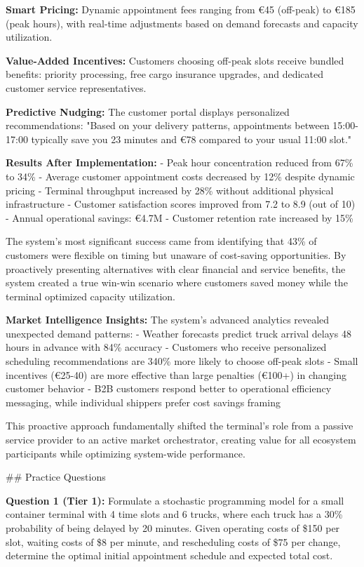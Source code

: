\documentclass{article}
\begin{document}
\textbf{Smart Pricing:} Dynamic appointment fees ranging from €45 (off-peak) to €185 (peak hours), with real-time adjustments based on demand forecasts and capacity utilization.

\textbf{Value-Added Incentives:} Customers choosing off-peak slots receive bundled benefits: priority processing, free cargo insurance upgrades, and dedicated customer service representatives.

\textbf{Predictive Nudging:} The customer portal displays personalized recommendations: "Based on your delivery patterns, appointments between 15:00-17:00 typically save you 23 minutes and €78 compared to your usual 11:00 slot."

\textbf{Results After Implementation:}
- Peak hour concentration reduced from 67\% to 34\%
- Average customer appointment costs decreased by 12\% despite dynamic pricing
- Terminal throughput increased by 28\% without additional physical infrastructure
- Customer satisfaction scores improved from 7.2 to 8.9 (out of 10)
- Annual operational savings: €4.7M
- Customer retention rate increased by 15\%

The system's most significant success came from identifying that 43\% of customers were flexible on timing but unaware of cost-saving opportunities. By proactively presenting alternatives with clear financial and service benefits, the system created a true win-win scenario where customers saved money while the terminal optimized capacity utilization.

\textbf{Market Intelligence Insights:} The system's advanced analytics revealed unexpected demand patterns:
- Weather forecasts predict truck arrival delays 48 hours in advance with 84\% accuracy
- Customers who receive personalized scheduling recommendations are 340\% more likely to choose off-peak slots
- Small incentives (€25-40) are more effective than large penalties (€100+) in changing customer behavior
- B2B customers respond better to operational efficiency messaging, while individual shippers prefer cost savings framing

This proactive approach fundamentally shifted the terminal's role from a passive service provider to an active market orchestrator, creating value for all ecosystem participants while optimizing system-wide performance.

## Practice Questions

\textbf{Question 1 (Tier 1):} Formulate a stochastic programming model for a small container terminal with 4 time slots and 6 trucks, where each truck has a 30\% probability of being delayed by 20 minutes. Given operating costs of \$150 per slot, waiting costs of \$8 per minute, and rescheduling costs of \$75 per change, determine the optimal initial appointment schedule and expected total cost.
\end{document}
